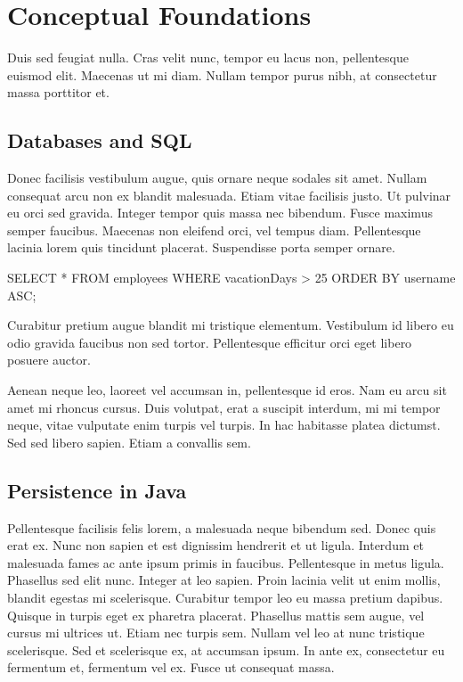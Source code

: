 %
\section{Conceptual Foundations}
\label{sec:conceptual-foundations}
%

Duis sed feugiat nulla. Cras velit nunc, tempor eu lacus non, pellentesque euismod elit. Maecenas ut mi diam. Nullam tempor purus nibh, at consectetur massa porttitor et.

%
\subsection{Databases and SQL}
\label{subsec:limitations}
%

Donec facilisis vestibulum augue, quis ornare neque sodales sit amet. Nullam consequat arcu non ex blandit malesuada. Etiam vitae facilisis justo. Ut pulvinar eu orci sed gravida. Integer tempor quis massa nec bibendum. Fusce maximus semper faucibus. Maecenas non eleifend orci, vel tempus diam. Pellentesque lacinia lorem quis tincidunt placerat. Suspendisse porta semper ornare. 

\begin{sqlscript}[caption=SQL query for retrieving the data of all employees with more than 25 days of vacation{,} sorted by username.]
SELECT *
FROM employees
WHERE vacationDays > 25
ORDER BY username ASC;
\end{sqlscript}

Curabitur pretium augue blandit mi tristique elementum. Vestibulum id libero eu odio gravida faucibus non sed tortor. Pellentesque efficitur orci eget libero posuere auctor.


Aenean neque leo, laoreet vel accumsan in, pellentesque id eros. Nam eu arcu sit amet mi rhoncus cursus. Duis volutpat, erat a suscipit interdum, mi mi tempor neque, vitae vulputate enim turpis vel turpis. In hac habitasse platea dictumst. Sed sed libero sapien. Etiam a convallis sem. 

%
\subsection{Persistence in Java}
\label{subsec:persistence-in-java}
%

Pellentesque facilisis felis lorem, a malesuada neque bibendum sed. Donec quis erat ex. Nunc non sapien et est dignissim hendrerit et ut ligula. Interdum et malesuada fames ac ante ipsum primis in faucibus. Pellentesque in metus ligula. Phasellus sed elit nunc. Integer at leo sapien. Proin lacinia velit ut enim mollis, blandit egestas mi scelerisque. Curabitur tempor leo eu massa pretium dapibus. Quisque in turpis eget ex pharetra placerat. Phasellus mattis sem augue, vel cursus mi ultrices ut. Etiam nec turpis sem. Nullam vel leo at nunc tristique scelerisque. Sed et scelerisque ex, at accumsan ipsum. In ante ex, consectetur eu fermentum et, fermentum vel ex. Fusce ut consequat massa.

